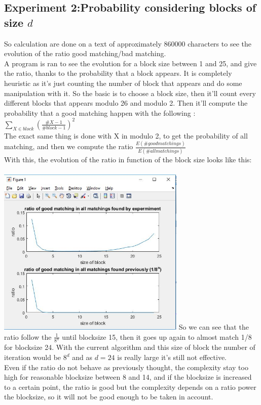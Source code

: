 \documentclass{article}
\begin{document}
\subsection*{Experiment 2:Probability considering blocks of size $d$}
So calculation are done on a text of approximately $860000$ characters to see the evolution of the ratio good matching/bad matching.\\
A program is ran to see the evolution for a block size between 1 and 25, and give the ratio, thanks to the probability that a block appears. It is completely heuristic as it's just counting the number of block that appears and do some manipulation with it.
So the basic is to choose a block size, then it'll count every different blocks that appears modulo 26 and modulo 2.
Then it'll compute the probability that a good matching happen with the following : $\sum_{X \in block}({\frac{\#X -1}{\#block -1}})^2 $\\
The exact same thing is done with X in modulo 2, to get the probability of all matching, and then we compute the ratio $\frac{E(\# good matchings)}{E(\# all matchings)}$\\
With this, the evolution of the ratio in function of the block size looks like this:\\
\\
\includegraphics[width=90mm]{ratio.jpg}
So we can see that the ratio follow the $\frac{1}{8^n}$ until blocksize 15, then it goes up again to almost match 1/8 for blocksize 24. With the current algorithm and this size of block the number of iteration would be $8^d$ and as $d = 24$ is really large it's still not effective.\\
Even if the ratio do not behave as previously thought, the complexity stay too high for reasonable blocksize between 8 and 14, and if the blocksize is increased to a certain point, the ratio is good but the complexity depends on a ratio power the blocksize, so it will not be good enough to be taken in account.
\end{document}
